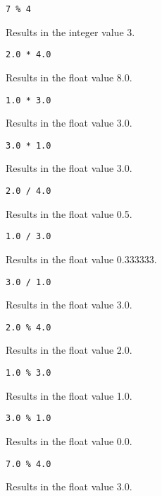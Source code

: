 {\begin{itemize}
{		\item[] \texttt{7 \% 4}
		
			Results in the integer value 3.
		
		\item[] \texttt{2.0 * 4.0}
		
			Results in the float value 8.0.
		
		\item[] \texttt{1.0 * 3.0}
		
			Results in the float value 3.0.
		
		\item[] \texttt{3.0 * 1.0}
		
			Results in the float value 3.0.
			
		\item[] \texttt{2.0 / 4.0}
		
			Results in the float value 0.5.
		
		\item[] \texttt{1.0 / 3.0}
		
			Results in the float value 0.333333.
		
		\item[] \texttt{3.0 / 1.0}
		
			Results in the float value 3.0.
			
		\item[] \texttt{2.0 \% 4.0}
		
			Results in the float value 2.0.
		
		\item[] \texttt{1.0 \% 3.0}
		
			Results in the float value 1.0.
		
		\item[] \texttt{3.0 \% 1.0}
		
			Results in the float value 0.0.
		
		\item[] \texttt{7.0 \% 4.0}
		
			Results in the float value 3.0.
	}
	\end{itemize}
}















